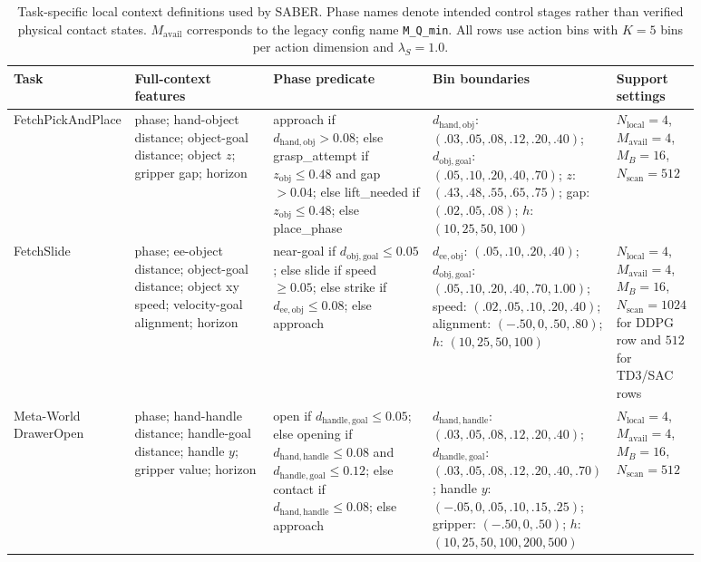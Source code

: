 \documentclass[letterpaper]{article}
\begin{document}
\begin{table}[t]
\centering
\scriptsize
\caption{Task-specific local context definitions used by SABER. Phase names denote intended control stages rather than verified physical contact states. \(M_{\mathrm{avail}}\) corresponds to the legacy config name \texttt{M\_Q\_min}. All rows use action bins with \(K=5\) bins per action dimension and \(\lambda_S=1.0\).}
\label{tab:context-definitions}
\begin{tabular}{@{}p{0.11\linewidth}p{0.20\linewidth}p{0.23\linewidth}p{0.22\linewidth}p{0.12\linewidth}@{}}
\toprule
Task & Full-context features & Phase predicate & Bin boundaries & Support settings \\
\midrule
FetchPickAndPlace &
phase; hand-object distance; object-goal distance; object \(z\); gripper gap; horizon &
approach if \(d_{\mathrm{hand,obj}}>0.08\); else grasp\_attempt if \(z_{\mathrm{obj}}\le0.48\) and gap \(>0.04\); else lift\_needed if \(z_{\mathrm{obj}}\le0.48\); else place\_phase &
\(d_{\mathrm{hand,obj}}\): \((.03,.05,.08,.12,.20,.40)\);
\(d_{\mathrm{obj,goal}}\): \((.05,.10,.20,.40,.70)\);
\(z\): \((.43,.48,.55,.65,.75)\);
gap: \((.02,.05,.08)\);
\(h\): \((10,25,50,100)\) &
\(N_{\mathrm{local}}=4\), \(M_{\mathrm{avail}}=4\), \(M_B=16\), \(N_{\mathrm{scan}}=512\) \\
\midrule
FetchSlide &
phase; ee-object distance; object-goal distance; object xy speed; velocity-goal alignment; horizon &
near-goal if \(d_{\mathrm{obj,goal}}\le0.05\); else slide if speed \(\ge0.05\); else strike if \(d_{\mathrm{ee,obj}}\le0.08\); else approach &
\(d_{\mathrm{ee,obj}}\): \((.05,.10,.20,.40)\);
\(d_{\mathrm{obj,goal}}\): \((.05,.10,.20,.40,.70,1.00)\);
speed: \((.02,.05,.10,.20,.40)\);
alignment: \((-.50,0,.50,.80)\);
\(h\): \((10,25,50,100)\) &
\(N_{\mathrm{local}}=4\), \(M_{\mathrm{avail}}=4\), \(M_B=16\), \(N_{\mathrm{scan}}=1024\) for DDPG row and \(512\) for TD3/SAC rows \\
\midrule
Meta-World DrawerOpen &
phase; hand-handle distance; handle-goal distance; handle \(y\); gripper value; horizon &
open if \(d_{\mathrm{handle,goal}}\le0.05\); else opening if \(d_{\mathrm{hand,handle}}\le0.08\) and \(d_{\mathrm{handle,goal}}\le0.12\); else contact if \(d_{\mathrm{hand,handle}}\le0.08\); else approach &
\(d_{\mathrm{hand,handle}}\): \((.03,.05,.08,.12,.20,.40)\);
\(d_{\mathrm{handle,goal}}\): \((.03,.05,.08,.12,.20,.40,.70)\);
handle \(y\): \((-.05,0,.05,.10,.15,.25)\);
gripper: \((-.50,0,.50)\);
\(h\): \((10,25,50,100,200,500)\) &
\(N_{\mathrm{local}}=4\), \(M_{\mathrm{avail}}=4\), \(M_B=16\), \(N_{\mathrm{scan}}=512\) \\
\bottomrule
\end{tabular}
\end{table}
\end{document}
